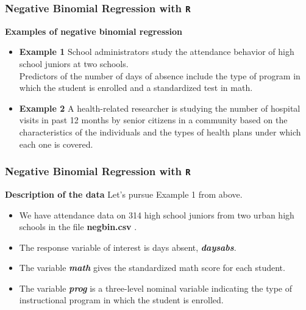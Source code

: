 \documentclass[00-GLMregslides.tex]{subfiles}
\begin{document}
	
\begin{frame}[fragile]
	\frametitle{Negative Binomial Regression with \texttt{R} }
	\Large
	
\textbf{Examples of negative binomial regression}
\begin{itemize}
\item \textbf{Example 1}  School administrators study the attendance behavior of high school juniors at two schools. \\ Predictors of the number of days of absence include the type of program in which the student is enrolled and a standardized test in math.

\item \textbf{Example 2}  A health-related researcher is studying the number of hospital visits in past 12 months by senior citizens in a community based on the characteristics of the individuals and the types of health plans under which each one is covered.
\end{itemize}
\end{frame}
\begin{frame}[fragile]
	\frametitle{Negative Binomial Regression with \texttt{R} }
	\Large
	
\textbf{Description of the data}
Let's pursue Example 1 from above.
\begin{itemize}
\item We have attendance data on 314 high school juniors from two urban high schools in the file \textbf{negbin.csv }. 
\item The response variable of interest is days absent, \textbf{\textit{daysabs}}. 
\item The variable \textbf{\textit{math}} gives the standardized math score for each student. 
\item The variable \textbf{\textit{prog}} is a three-level nominal variable indicating the type of instructional program in which the student is enrolled.
\end{itemize}
\end{frame}
	
\end{document}
